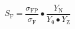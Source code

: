 \[S_{\mathrm{F}}\mathrm{=}\frac{{\sigma }_{\mathrm{FP}}}{{\sigma }_{\mathrm{F}}}\bullet \frac{Y_{\mathrm{N}}}{Y_{\mathrm{\theta }}\bullet Y_{\mathrm{Z}}}\]